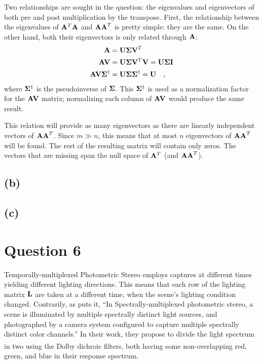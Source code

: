 \documentclass{report}
\begin{document}
Two relationships are sought in the question: the eigenvalues and eigenvectors of both pre and post multiplication by the transpose. First, the relationship between the eigenvalues of $\mathbf{A}^T\mathbf{A}$ and $\mathbf{AA}^T$ is pretty simple: they are the same. On the other hand, both their eigenvectors is only related through $\mathbf{A}$:
\begin{align*}
\mathbf{A}  &= \mathbf{U \Sigma V}^T \\
\mathbf{AV} &= \mathbf{U \Sigma V}^T \mathbf{V} = \mathbf{U \Sigma I} \\
\mathbf{AV\Sigma}^\dagger &= \mathbf{U \Sigma \Sigma}^\dagger = \mathbf{U} \quad,
\end{align*}
where $\mathbf{\Sigma}^\dagger$ is the pseudoinverse of $\mathbf{\Sigma}$. This $\mathbf{\Sigma}^\dagger$ is used as a normalization factor for the $\mathbf{AV}$ matrix; normalizing each column of $\mathbf{AV}$ would produce the same result.

This relation will provide as many eigenvectors as there are linearly independent vectors of $\mathbf{AA}^T$. Since $m \gg n$, this means that at most $n$ eigenvectors of $\mathbf{AA}^T$ will be found. The rest of the resulting matrix will contain only zeros. The vectors that are missing span the null space of $\mathbf{A}^T$ (and $\mathbf{AA}^T$).

\subsection{(b)}



\subsection{(c)}
\section{Question 6}

Temporally-multiplexed Photometric Stereo employs captures at different times yielding different lighting directions. This means that each row of the lighting matrix $\mathbf{L}$ are taken at a different time, when the scene's lighting condition changed. Contrarily, as \cite{Fyffe2011} puts it, ``In Spectrally-multiplexed photometric stereo, a scene is illuminated by multiple spectrally distinct light sources, and photographed by a camera system configured to capture multiple spectrally distinct color channels.'' In their work, they propose to divide the light spectrum in two using the Dolby\textsuperscript{\textregistered} dichroic filters, both having some non-overlapping red, green, and blue in their response spectrum.
\end{document}
